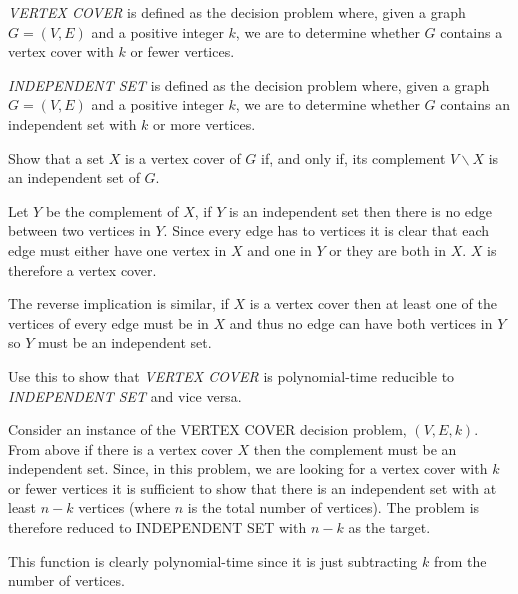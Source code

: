\documentclass{supervision}
\begin{document}
\begin{questions}
\begin{parts}
          \emph{VERTEX COVER} is defined as the decision problem where, given a
          graph $G = (V, E)$ and a positive integer $k$, we are to determine
          whether $G$ contains a vertex cover with $k$ or fewer vertices.

          \emph{INDEPENDENT SET} is defined as the decision problem where, given
          a graph $G = (V, E)$ and a positive integer $k$, we are to determine
          whether $G$ contains an independent set with $k$ or more vertices.

          \begin{subparts}
            \subpart[2] Show that a set $X$ is a vertex cover of $G$ if, and
              only if, its complement $V \backslash X$ is an independent set of
              $G$.
              \begin{solution}
                Let $Y$ be the complement of $X$, if $Y$ is an independent set
                then there is no edge between two vertices in $Y$. Since every
                edge has to vertices it is clear that each edge must either have
                one vertex in $X$ and one in $Y$ or they are both in $X$. $X$ is
                therefore a vertex cover.

                The reverse implication is similar, if $X$ is a vertex cover
                then at least one of the vertices of every edge must be in $X$
                and thus no edge can have both vertices in $Y$ so $Y$ must be an
                independent set.
              \end{solution}

            \subpart[6] Use this to show that \emph{VERTEX COVER} is
              polynomial-time reducible to \emph{INDEPENDENT SET} and vice
              versa.
              \begin{solution}
                Consider an instance of the VERTEX COVER decision problem, $(V,
                E, k)$. From above if there is a vertex cover $X$ then the
                complement must be an independent set. Since, in this problem,
                we are looking for a vertex cover with $k$ or fewer vertices it
                is sufficient to show that there is an independent set with
                at least $n - k$ vertices (where $n$ is the total number of
                vertices). The problem is therefore reduced to INDEPENDENT SET
                with $n - k$ as the target.

                This function is clearly polynomial-time since it is just
                subtracting $k$ from the number of vertices.


\end{solution}
\end{subparts}
\end{parts}
\end{questions}
\end{document}
